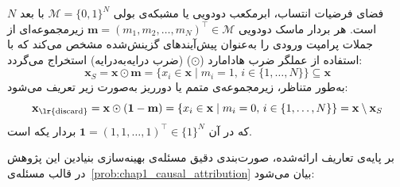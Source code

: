 \begin{definition}\label{def:chap1_mask_space}
فضای فرضیات انتساب، ابرمکعب دودویی یا مشبکه‌ی بولی $\mathcal{M} = {\{0, 1\}}^N$ با بعد $N$ است. هر بردار ماسک دودویی $\mathbf{m} = {(m_1, m_2, \ldots, m_N)}^\top \in \mathcal{M}$ زیرمجموعه‌ای از جملات پرامپت ورودی را به‌عنوان پیش‌آیندهای گزینش‌شده مشخص می‌کند که با استفاده از عملگر ضرب هادامارد ($\odot$) (ضرب درایه‌به‌درایه) استخراج می‌گردد:
\begin{equation}\label{eq:chap1_subset_mask}
    \mathbf{x}_S = \mathbf{x} \odot \mathbf{m} = \{ x_i \in \mathbf{x} \mid m_i = 1, \, i \in \{1, \ldots, N\} \} \subseteq \mathbf{x}
\end{equation}
به‌طور متناظر، زیرمجموعه‌ی متمم یا دورریز به‌صورت زیر تعریف می‌شود:
\begin{equation}\label{eq:chap1_subset_discard}
    \mathbf{x}_{\text{\lr{discard}}} = \mathbf{x} \odot (\mathbf{1} - \mathbf{m}) = \{ x_i \in \mathbf{x} \mid m_i = 0, \, i \in \{1, \ldots, N\} \} = \mathbf{x} \setminus \mathbf{x}_S
\end{equation}
که در آن $\mathbf{1} = {(1, 1, \ldots, 1)}^\top \in {\{1\}}^N$ بردار یکه است.
\end{definition}

بر پایه‌ی تعاریف ارائه‌شده، صورت‌بندی دقیق مسئله‌ی بهینه‌سازی بنیادین این پژوهش در قالب مسئله‌ی~\ref{prob:chap1_causal_attribution} بیان می‌شود:

